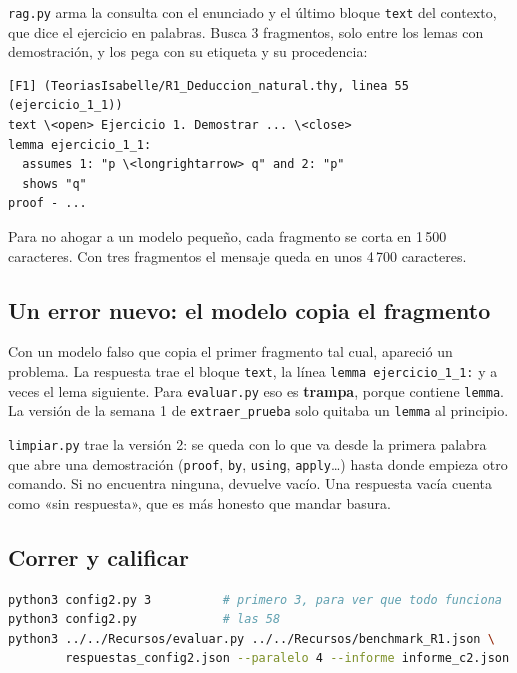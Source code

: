 \documentclass[11pt,a4paper]{article}
\newcommand{\cd}[1]{\texttt{\small #1}}
\begin{document}
\cd{rag.py} arma la consulta con el enunciado y el último bloque
\cd{text} del contexto, que dice el ejercicio en palabras. Busca 3
fragmentos, solo entre los lemas con demostración, y los pega con su
etiqueta y su procedencia:

\begin{lstlisting}
[F1] (TeoriasIsabelle/R1_Deduccion_natural.thy, linea 55 (ejercicio_1_1))
text \<open> Ejercicio 1. Demostrar ... \<close>
lemma ejercicio_1_1:
  assumes 1: "p \<longrightarrow> q" and 2: "p"
  shows "q"
proof - ...
\end{lstlisting}

Para no ahogar a un modelo pequeño, cada fragmento se corta en 1\,500
caracteres. Con tres fragmentos el mensaje queda en unos 4\,700 caracteres.

\subsection{Un error nuevo: el modelo copia el fragmento}

Con un modelo falso que copia el primer fragmento tal cual, apareció un
problema. La respuesta trae el bloque \cd{text}, la línea \cd{lemma
ejercicio\_1\_1:} y a veces el lema siguiente. Para \cd{evaluar.py} eso es
\textbf{trampa}, porque contiene \cd{lemma}. La versión de la semana 1 de
\cd{extraer\_prueba} solo quitaba un \cd{lemma} al principio.

\cd{limpiar.py} trae la versión 2: se queda con lo que va desde la primera
palabra que abre una demostración (\cd{proof}, \cd{by}, \cd{using},
\cd{apply}\ldots) hasta donde empieza otro comando. Si no encuentra
ninguna, devuelve vacío. Una respuesta vacía cuenta como «sin respuesta»,
que es más honesto que mandar basura.

\subsection{Correr y calificar}

\begin{haga}
\begin{lstlisting}[language=bash]
python3 config2.py 3          # primero 3, para ver que todo funciona
python3 config2.py            # las 58
python3 ../../Recursos/evaluar.py ../../Recursos/benchmark_R1.json \
        respuestas_config2.json --paralelo 4 --informe informe_c2.json
\end{lstlisting}
\end{haga}
\end{document}
